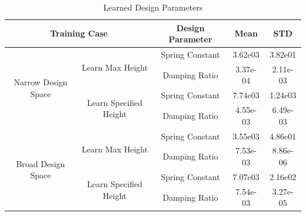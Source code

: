 \documentclass[letterpaper, 10 pt, conference]{ieeeconf}  %
\begin{document}
%
\begin{table}[ht]
        \caption{Learned Design Parameters}
        \vspace{-4mm}
        \label{tab:learned_design_params}
                \begin{center}
                \begin{tabular}{|c||c||c||c||c|}
                \hline
                \multicolumn{2}{|c||}{Training Case}                                                                           & Design Parameter & Mean     & STD      \\
                \hline
                \multirow{4}{*}{\centering Narrow Design Space}           & \multirow{2}{*}{\centering Learn Max Height}       & Spring Constant  & 3.62e03  & 3.82e01  \\
                                                                          &                                                    & Damping Ratio    & 3.37e-04 & 2.11e-03 \\
                                                                          & \multirow{2}{*}{\centering Learn Specified Height} & Spring Constant  & 7.74e03  & 1.24e03  \\
                                                                          &                                                    & Damping Ratio    & 4.55e-03 & 6.49e-03 \\
                \multirow{4}{*}{\centering Broad Design Space}            & \multirow{2}{*}{\centering Learn Max Height}       & Spring Constant  & 3.55e03  & 4.86e01  \\
                                                                          &                                                    & Damping Ratio    & 7.53e-03 & 8.86e-06 \\
                                                                          & \multirow{2}{*}{\centering Learn Specified Height} & Spring Constant  & 7.07e03  & 2.16e02  \\
                                                                          &                                                    & Damping Ratio    & 7.54e-03 & 3.27e-05 \\
                \hline
                \end{tabular}
                \end{center}
        \end{table}

\end{document}
